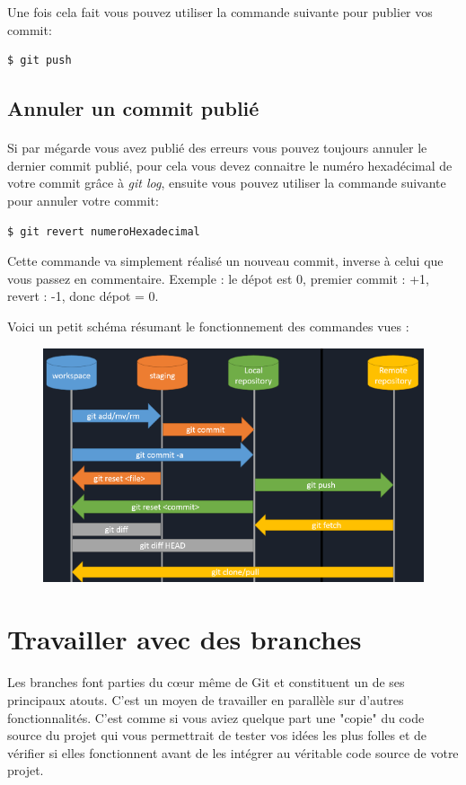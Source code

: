 \documentclass[french, a4paper, 12pt, titlepage]{article}
\begin{document}
Une fois cela fait vous pouvez utiliser la commande suivante pour publier vos commit:
\begin{lstlisting}
$ git push
\end{lstlisting}

\subsection{Annuler un commit publié}
\paragraph{}Si par mégarde vous avez publié des erreurs vous pouvez toujours annuler le dernier commit publié, pour cela vous devez connaitre le numéro hexadécimal de votre commit grâce à \emph{git log}, ensuite vous pouvez utiliser la commande suivante pour annuler votre commit:
\begin{lstlisting}
$ git revert numeroHexadecimal
\end{lstlisting}
Cette commande va simplement réalisé un nouveau commit, inverse à celui que vous passez en commentaire. Exemple : le dépot est 0, premier commit : +1, revert : -1, donc dépot = 0.

\newpage
Voici un petit schéma résumant le fonctionnement des commandes vues :
\begin{figure}[h]
\includegraphics[width=\textwidth]{DeroulementProtocoleGit}
\end{figure}

\section{Travailler avec des branches}
\paragraph{}Les branches font parties du cœur même de Git et constituent un de ses principaux atouts. C’est un moyen de travailler en parallèle sur d’autres fonctionnalités. C’est comme si vous aviez quelque part une "copie" du code source du projet qui vous permettrait de tester vos idées les plus folles et de vérifier si elles fonctionnent avant de les intégrer au véritable code source de votre projet.
\end{document}
